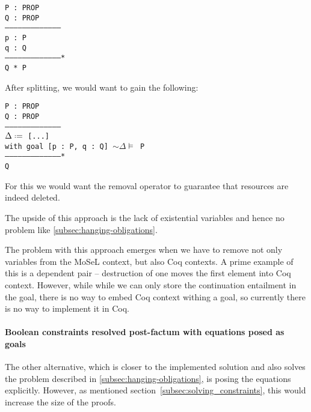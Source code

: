 \begin{minipage}{\linewidth}
\texttt{P : PROP\\
Q : PROP\\
---------------------------------------\\
p : P\\
q : Q\\
---------------------------------------*\\
Q * P
}
\end{minipage}

After splitting, we would want to gain the following:

\begin{minipage}{\linewidth}
\texttt{P : PROP\\
Q : PROP\\
---------------------------------------\\
$\Delta \defeq$ [...]\\
with goal [p : P, q : Q] $\sim \Delta \vDash$ P\\
---------------------------------------*\\
Q
}
\end{minipage}

For this we would want the removal operator to guarantee that resources are indeed deleted.

The upside of this approach is the lack of existential variables and hence no problem like \ref{subsec:hanging-obligations}.

The problem with this approach emerges when we have to remove not only variables from the MoSeL context, but also Coq contexts.
A prime example of this is a dependent pair -- destruction of one moves the first element into Coq context.
However, while while we can only store the continuation entailment in the goal, there is no way to embed Coq context withing a goal, so currently there is no way to implement it in Coq.

\paragraph{Boolean constraints resolved post-factum with equations posed as goals}

The other alternative, which is closer to the implemented solution and also solves the problem described in \ref{subsec:hanging-obligations}, is posing the equations explicitly.
However, as mentioned section~\ref{subsec:solving_constraints}, this would increase the size of the proofs.

